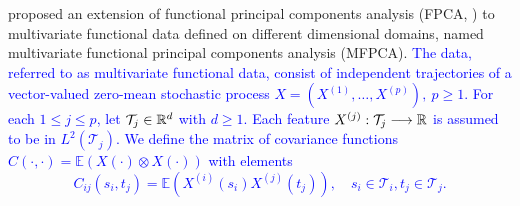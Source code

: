 \cite{happMultivariateFunctionalPrincipal2018} proposed an extension of functional principal components analysis (FPCA, \cite{ramsayFunctionalDataAnalysis2005}) to multivariate functional data defined on different dimensional domains, named multivariate functional principal components analysis (MFPCA). \textcolor{blue}{The data, referred to as multivariate functional data, consist of independent trajectories of a vector-valued zero-mean stochastic process $X = (X^{(1)}, \ldots, X^{(p)}),~p \geq 1$. For each $1 \leq j \leq p$, let $\mathcal{T}_j \in \mathbb{R}^d$ with $d \geq 1$. Each feature $X^{(j)}: \mathcal{T}_j \longrightarrow \mathbb{R}$ is assumed to be in $L^{2}(\mathcal{T}_j)$. We define the matrix of covariance functions $C(\cdot, \cdot) = \mathbb{E}(X(\cdot) \otimes X(\cdot))$ with elements
\begin{equation}\label{eq:cov}
C_{ij}(s_i, t_j) = \mathbb{E}(X^{(i)}(s_i)X^{(j)}(t_j)), \quad s_i \in \mathcal{T}_i, t_j \in \mathcal{T}_j.    
\end{equation}
}

